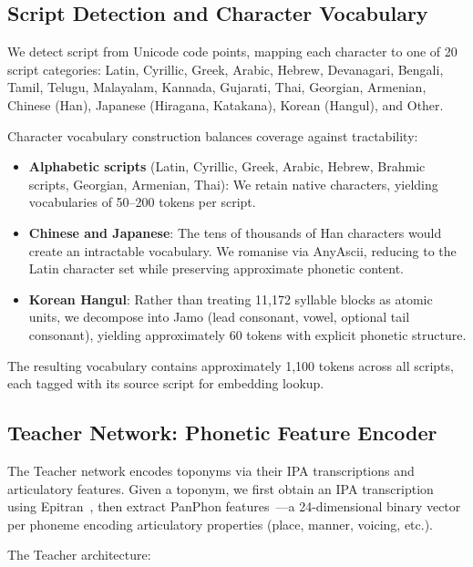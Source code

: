 \documentclass[11pt,a4paper]{article}
\begin{document}
\subsection{Script Detection and Character Vocabulary}

We detect script from Unicode code points, mapping each character to one of 20 script categories: Latin, Cyrillic, Greek, Arabic, Hebrew, Devanagari, Bengali, Tamil, Telugu, Malayalam, Kannada, Gujarati, Thai, Georgian, Armenian, Chinese (Han), Japanese (Hiragana, Katakana), Korean (Hangul), and Other.

Character vocabulary construction balances coverage against tractability:

\begin{itemize}
    \item \textbf{Alphabetic scripts} (Latin, Cyrillic, Greek, Arabic, Hebrew, Brahmic scripts, Georgian, Armenian, Thai): We retain native characters, yielding vocabularies of 50--200 tokens per script.

    \item \textbf{Chinese and Japanese}: The tens of thousands of Han characters would create an intractable vocabulary. We romanise via AnyAscii, reducing to the Latin character set while preserving approximate phonetic content.

    \item \textbf{Korean Hangul}: Rather than treating 11,172 syllable blocks as atomic units, we decompose into Jamo (lead consonant, vowel, optional tail consonant), yielding approximately 60 tokens with explicit phonetic structure.
\end{itemize}

The resulting vocabulary contains approximately 1,100 tokens across all scripts, each tagged with its source script for embedding lookup.

\subsection{Teacher Network: Phonetic Feature Encoder}

The Teacher network encodes toponyms via their IPA transcriptions and articulatory features. Given a toponym, we first obtain an IPA transcription using Epitran~\citep{mortensen2018}, then extract PanPhon features~\citep{mortensen2016}---a 24-dimensional binary vector per phoneme encoding articulatory properties (place, manner, voicing, etc.).

The Teacher architecture:
\end{document}
